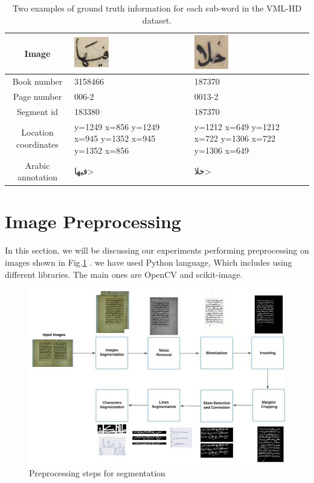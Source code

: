 \begin{table}[!htb]
\begin{center}
\begin{tabular}[htbp!]{ | c | m{3cm}| m{3cm} | } 
  \hline
  Image & \includegraphics[width=1.5cm ]{images/feha.png} & \includegraphics[width=1.5cm ]{images/khla.png} \\ 
  \hline
  Book number & 3158466 & 187370 \\ 
  \hline
  Page number & 006-2 & 0013-2 \\ 
  \hline
  Segment id & 183380 & 187370 \\ 
  \hline
  Location coordinates & y=1249 x=856  y=1249 x=945  y=1352 x=945
 y=1352   x=856 & y=1212 x=649  y=1212 x=722  y=1306 x=722  y=1306  x=649 \\ 
   \hline
  Arabic annotation & \<فيها>\ &\<خلا> \\ 
  \hline
\end{tabular}
\end{center}
\caption{Two examples of ground truth information for each sub-word in the VML-HD dataset.}
\label{table:2.1}
\end{table}

\section{Image Preprocessing}
In this section, we will be discussing our experiments performing preprocessing on images shown in Fig.\ref{fig:preprocessing} . we have used Python language, Which includes using different libraries. The main ones are OpenCV and scikit-image.

\begin{figure}[!htb]
    \centering
    \includegraphics[width=14cm]{images/preprocessing.png}
    \caption{Preprocessing steps for segmentation}
    \label{fig:preprocessing}
\end{figure}

